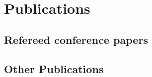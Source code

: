 
\section{Publications}

\subsection{Refereed conference papers}

\begin{refsection} %
\nocite{Rivera-Rubio2013} %
\printbibliography[heading=subbibliography] %
\end{refsection}

%
%

\subsection{Other Publications}
\begin{refsection} %
\nocite{Rivera-Rubiotranslator2010} %
\printbibliography[heading=subbibliography] %
\end{refsection}


